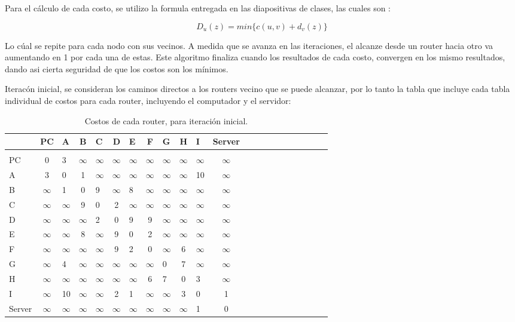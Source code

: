 \documentclass[a4papaer]{article}
\begin{document}
Para el cálculo de cada costo, se utilizo la formula entregada en las diapositivas de clases, las cuales son :

$$D_u(z)=min\{c(u,v)+d_v(z)\}$$

Lo cúal se repite para cada nodo con sus vecinos. A medida que se avanza en las iteraciones, el alcanze desde un router hacia otro va aumentando en 1 por cada una de estas. Este algoritmo finaliza cuando los resultados de cada costo, convergen en los mismo resultados, dando asi cierta seguridad de que los costos son los mínimos.

Iteracón inicial, se consideran los caminos directos a los routers vecino que se puede alcanzar, por lo tanto la tabla que incluye cada tabla individual de costos para cada router, incluyendo el computador y el servidor:

\begin{table}[h]
\centering
\begin{tabular}{lclclclclclclclclclclc}

& PC & A & B & C & D & E & F & G & H & I & Server \\\hline\\
PC&0&3&$\infty$&$\infty$&$\infty$&$\infty$&$\infty$&$\infty$&$\infty$&$\infty$&$\infty$ \\
A&3&0&1&$\infty$&$\infty$&$\infty$&$\infty$&$\infty$&$\infty$&10&$\infty$ \\
B&$\infty$&1&0&9&$\infty$&8&$\infty$&$\infty$&$\infty$&$\infty$&$\infty$ \\
C&$\infty$&$\infty$&9&0&2&$\infty$&$\infty$&$\infty$&$\infty$&$\infty$&$\infty$ \\
D&$\infty$&$\infty$&$\infty$&2&0&9&9&$\infty$&$\infty$&$\infty$&$\infty$ \\
E&$\infty$&$\infty$&8&$\infty$&9&0&2&$\infty$&$\infty$&$\infty$&$\infty$ \\
F&$\infty$&$\infty$&$\infty$&$\infty$&9&2&0&$\infty$&6&$\infty$&$\infty$ \\
G&$\infty$&4&$\infty$&$\infty$&$\infty$&$\infty$&$\infty$&0&7&$\infty$&$\infty$ \\
H&$\infty$&$\infty$&$\infty$&$\infty$&$\infty$&$\infty$&6&7&0&3&$\infty$ \\
I&$\infty$&10&$\infty$&$\infty$&2&1&$\infty$&$\infty$&3&0&1 \\
Server&$\infty$&$\infty$&$\infty$&$\infty$&$\infty$&$\infty$&$\infty$&$\infty$&$\infty$&1&0 \\

\end{tabular}
\caption{\label{tab:widgets}Costos de cada router, para iteración inicial.}
\end{table}
\end{document}
